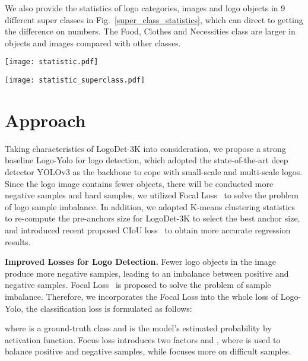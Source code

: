 \documentclass[journal]{IEEEtran}
\begin{document}
We also provide the statistics of logo categories, images and logo objects in 9 different super classes in Fig.~\ref{super_class_statistics}, which can direct to getting the difference on numbers. The Food, Clothes and Necessities class are larger in objects and images compared with other classes.

\begin{figure*}[!t]
	\centering
	\texttt{[image: statistic.pdf]}
	\caption{The detailed statistics of LogoDet-3K about Image and object distribution in per category, the number of objects in per image and object size in per image.}
	\label{statistic}
\end{figure*}
\begin{figure*}[!t]
	\centering
	\texttt{[image: statistic\_superclass.pdf]}
	\caption{Distributions of categories, images and objects from LogoDet-3K on super-classes.}
	\label{super_class_statistics}
\end{figure*}





\section{Approach}
Taking characteristics of LogoDet-3K into consideration, we propose a strong baseline Logo-Yolo for logo detection, which  adopted the state-of-the-art deep detector YOLOv3 as the backbone to cope with small-scale  and multi-scale logos. Since the logo image contains fewer objects, there will be conducted more negative samples and hard samples, we utilized Focal Loss~\cite{Tsung2017Focal} to solve the problem of logo sample imbalance. In addition, we adopted K-means clustering statistics to re-compute the pre-anchors size for LogoDet-3K to select the best anchor size, and introduced recent proposed CIoU loss~\cite{Zheng2020Distance} to obtain more accurate regression results.

\textbf{Improved Losses for Logo Detection.} Fewer logo objects in the image produce more negative samples, leading to an imbalance between positive and negative samples. Focal Loss~\cite{Tsung2017Focal} is proposed  to solve the problem of sample imbalance. Therefore, we incorporates the Focal Loss into the whole loss of Logo-Yolo, the classification loss is formulated as follows:

where  is a ground-truth class and  is the model's estimated probability by activation function. Focus loss introduces two factors  and , where  is used to balance positive and negative samples, while   focuses more on difficult samples.
\end{document}
